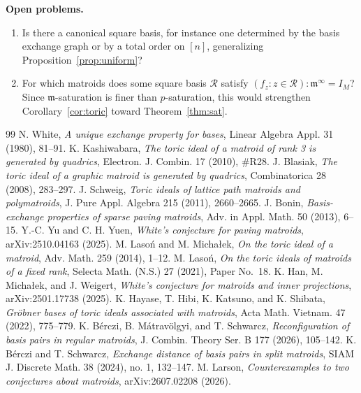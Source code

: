 \documentclass[11pt,a4paper]{article}
\theoremstyle{plain}
\theoremstyle{definition}
\begin{document}
\medskip\noindent\textbf{Open problems.}
\begin{enumerate}[label=(\arabic*),itemsep=2pt]
\item Is there a canonical square basis, for instance one determined by the basis exchange graph or by a total order on $[n]$, generalizing Proposition~\ref{prop:uniform}?
\item For which matroids does some square basis $\mathcal R$ satisfy $(f_z:z\in\mathcal R):\mathfrak m^\infty=I_M$? Since $\mathfrak m$-saturation is finer than $p$-saturation, this would strengthen Corollary~\ref{cor:toric} toward Theorem~\ref{thm:sat}.
\end{enumerate}

\begin{thebibliography}{99}
 N. White, \emph{A unique exchange property for bases}, Linear Algebra Appl. 31 (1980), 81--91.
 K. Kashiwabara, \emph{The toric ideal of a matroid of rank 3 is generated by quadrics}, Electron. J. Combin. 17 (2010), \#R28.
 J. Blasiak, \emph{The toric ideal of a graphic matroid is generated by quadrics}, Combinatorica 28 (2008), 283--297.
 J. Schweig, \emph{Toric ideals of lattice path matroids and polymatroids}, J. Pure Appl. Algebra 215 (2011), 2660--2665.
 J. Bonin, \emph{Basis-exchange properties of sparse paving matroids}, Adv. in Appl. Math. 50 (2013), 6--15.
 Y.-C. Yu and C. H. Yuen, \emph{White's conjecture for paving matroids}, arXiv:2510.04163 (2025).
 M. Laso\'n and M. Micha\l{}ek, \emph{On the toric ideal of a matroid}, Adv. Math. 259 (2014), 1--12.
 M. Laso\'n, \emph{On the toric ideals of matroids of a fixed rank}, Selecta Math. (N.S.) 27 (2021), Paper No.~18.
 K. Han, M. Micha\l{}ek, and J. Weigert, \emph{White's conjecture for matroids and inner projections}, arXiv:2501.17738 (2025).
 K. Hayase, T. Hibi, K. Katsuno, and K. Shibata, \emph{Gr\"obner bases of toric ideals associated with matroids}, Acta Math. Vietnam. 47 (2022), 775--779.
 K. B\'erczi, B. M\'atrav\"olgyi, and T. Schwarcz, \emph{Reconfiguration of basis pairs in regular matroids}, J. Combin. Theory Ser. B 177 (2026), 105--142.
 K. B\'erczi and T. Schwarcz, \emph{Exchange distance of basis pairs in split matroids}, SIAM J. Discrete Math. 38 (2024), no. 1, 132--147.
 M. Larson, \emph{Counterexamples to two conjectures about matroids}, arXiv:2607.02208 (2026).

\end{thebibliography}
\end{document}
